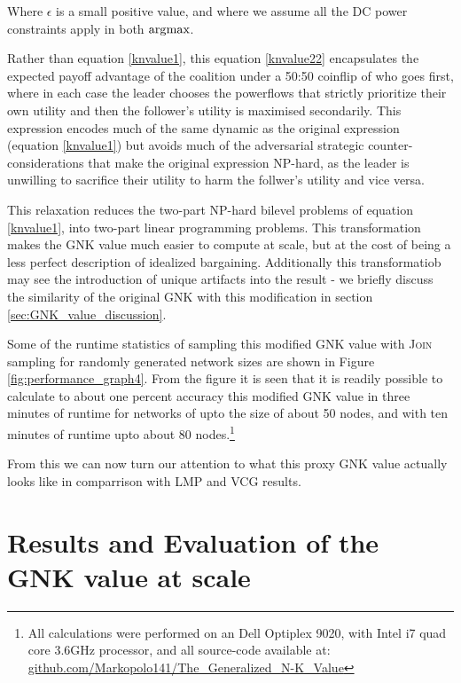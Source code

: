 Where $\epsilon$ is a small positive value, and where we assume all the DC power constraints apply in both $\operatorname*{\arg\!\max}$.

Rather than equation \eqref{knvalue1}, this equation \eqref{knvalue22} encapsulates the expected payoff advantage of the coalition under a 50:50 coinflip of who goes first, where in each case the leader chooses the powerflows that strictly prioritize their own utility and then the follower's utility is maximised secondarily.
This expression encodes much of the same dynamic as the original expression (equation \ref{knvalue1}) but avoids much of the adversarial strategic counter-considerations that make the original expression NP-hard, as the leader is unwilling to sacrifice their utility to harm the follwer's utility and vice versa.

This relaxation reduces the two-part NP-hard bilevel problems of equation \ref{knvalue1}, into two-part linear programming problems.
This transformation makes the GNK value much easier to compute at scale, but at the cost of being a less perfect description of idealized bargaining.
Additionally this transformatiob may see the introduction of unique artifacts into the result - we briefly discuss the similarity of the original GNK with this modification in section \ref{sec:GNK_value_discussion}.

Some of the runtime statistics of sampling this modified GNK value with \textsc{Join} sampling for randomly generated network sizes are shown in Figure \ref{fig:performance_graph4}.
From the figure it is seen that it is readily possible to calculate to about one percent accuracy this modified GNK value in three minutes of runtime for networks of upto the size of about 50 nodes, and with ten minutes of runtime upto about 80 nodes.\footnote{\label{note1} All calculations were performed on an Dell Optiplex 9020, with Intel i7 quad core 3.6GHz processor, and all source-code available at:\\
\href{https://github.com/Markopolo141/The\_Generalized\_N-K\_Value}{github.com/Markopolo141/The\_Generalized\_N-K\_Value}}

From this we can now turn our attention to what this proxy GNK value actually looks like in comparrison with LMP and VCG results.





\section{Results and Evaluation of the GNK value at scale}\label{sec:results_and_evaluation_of_GNK}


